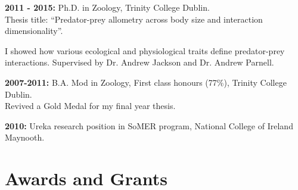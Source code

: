 \documentclass[10pt,a4paper]{article}
\begin{document}
\raggedright	
\textbf{2011 - 2015:} Ph.D. in Zoology, Trinity College Dublin.\\
Thesis title: “Predator-prey allometry across body size and interaction dimensionality”.\\ \par{\fontsize{10.5}{10} I showed how various ecological and physiological traits define predator-prey interactions. Supervised by Dr. Andrew Jackson and Dr. Andrew Parnell.
\bigskip}


\textbf{2007-2011:} B.A. Mod in Zoology, First class honours (77\%), Trinity College Dublin.\\
Revived a Gold Medal for my final year thesis.
\bigskip

\textbf{2010:} Ureka research position in SoMER program, National College of Ireland Maynooth.\\
\bigskip





\section{\textbf{Awards and Grants}}
\end{document}
